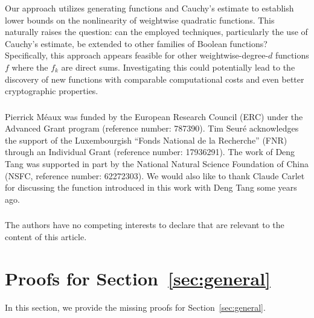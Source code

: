 \documentclass[runningheads,orivec]{llncs}
\begin{document}
    Our approach utilizes generating functions and Cauchy's estimate to establish lower bounds on the nonlinearity of weightwise quadratic functions. This naturally raises the question: can the employed techniques, particularly the use of Cauchy's estimate, be extended to other families of Boolean functions? Specifically, this approach appears feasible for other weightwise-degree-$d$ functions $f$ where the $f_k$ are direct sums. Investigating this could potentially lead to the discovery of new functions with comparable computational costs and even better cryptographic properties.
    
    \begin{credits}
        \subsubsection{\ackname}
    
        Pierrick Méaux was funded by the European Research Council (\textsf{ERC}) under the Advanced Grant program (reference number: 787390). Tim Seuré acknowledges the support of the Luxembourgish “Fonds National de la Recherche” (\textsf{FNR}) through an Individual Grant (reference number: 17936291). The work of Deng Tang was supported in part by the National Natural Science Foundation of China (\textsf{NSFC}, reference number: 62272303). We would also like to thank Claude Carlet for discussing the function introduced in this work with Deng Tang some years ago.

        \subsubsection{\discintname}

        The authors have no competing interests to declare that are relevant to the content of this article.
    \end{credits}
    
    \appendix
    
    \section{Proofs for Section~\ref{sec:general}}\label{sec:proofs}
    
    In this section, we provide the missing proofs for Section~\ref{sec:general}.
    
\end{document}
